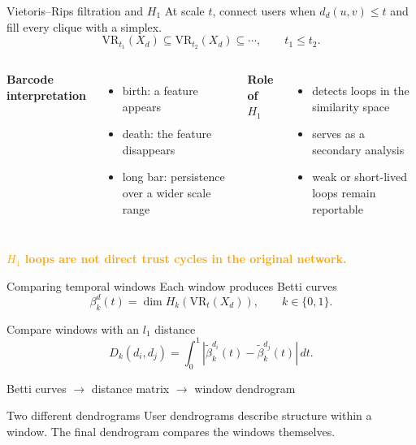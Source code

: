\documentclass[aspectratio=169,11pt]{beamer}
\newcommand{\term}[1]{\textcolor{Ocean}{\textbf{#1}}}
\newcommand{\caution}[1]{\textcolor{Orange}{\textbf{#1}}}
\begin{document}
\begin{frame}{Vietoris--Rips filtration and $H_1$}
  At scale $t$, connect users when $d_d(u,v)\leq t$ and fill every clique with a simplex.
  \[
    \mathrm{VR}_{t_1}(X_d)\subseteq
    \mathrm{VR}_{t_2}(X_d)\subseteq\cdots,
    \qquad t_1\leq t_2.
  \]

  \begin{columns}[T,onlytextwidth]
      \term{Barcode interpretation}
      \begin{itemize}
        \item birth: a feature appears
        \item death: the feature disappears
        \item long bar: persistence over a wider scale range
      \end{itemize}

      \term{Role of $H_1$}
      \begin{itemize}
        \item detects loops in the similarity space
        \item serves as a secondary analysis
        \item weak or short-lived loops remain reportable
      \end{itemize}
  \end{columns}

  \caution{$H_1$ loops are not direct trust cycles in the original network.}
\end{frame}

\begin{frame}{Comparing temporal windows}
  Each window produces Betti curves
  \[
    \beta_k^d(t)=\dim H_k\!\left(\mathrm{VR}_t(X_d)\right),
    \qquad k\in\{0,1\}.
  \]

  Compare windows with an $l_1$ distance
  \[
    D_k(d_i,d_j)=\int_0^1
    \left|\widetilde{\beta}_k^{d_i}(t)-
    \widetilde{\beta}_k^{d_j}(t)\right|\,dt.
  \]

  \vspace{0.15cm}
  \centering
  {\large
  Betti curves $\longrightarrow$ distance matrix $\longrightarrow$ window dendrogram}

  \vspace{0.35cm}
  \begin{block}{Two different dendrograms}
    User dendrograms describe structure within a window. The final dendrogram compares the windows themselves.
  \end{block}
\end{frame}
\end{document}
